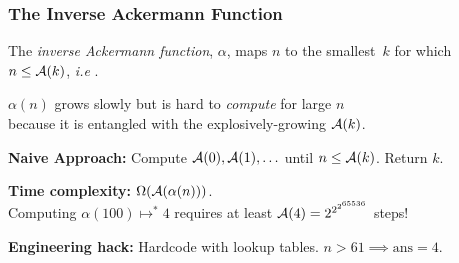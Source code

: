 			




\begin{frame}
\frametitle{The Inverse Ackermann Function}

The \emph{inverse Ackermann function}, $\alpha$, maps $n$ to the smallest~$k$ for
which~$n \le \mathcal{A}(k)$, \emph{i.e} .

\smallskip

\pause 
$\alpha(n)$ grows slowly but is hard to \emph{compute} for large $n$
\\ because it is entangled with the explosively-growing $\mathcal{A}(k)$.

\bigskip


\pause 
\textbf{Naive Approach:} Compute $\mathcal{A}(0), \mathcal{A}(1), \ldots$ until $n\le \mathcal{A}(k)$. Return $k$.

\bigskip

\pause 
\textbf{Time complexity:} $\Omega(\mathcal{A}(\alpha(n)))$.
\\ Computing $\alpha(100) \mapsto^{*} 4$ requires at least
$\mathcal{A}(4) = 2^{2^{2^{65536}}}$ steps!

\bigskip

\pause 
\textbf{Engineering hack:} Hardcode with lookup tables. $n > 61 \implies \text{ans} = 4$.

\bigskip

\pause 
{}
\end{frame}

%
%
%
%
%
%


